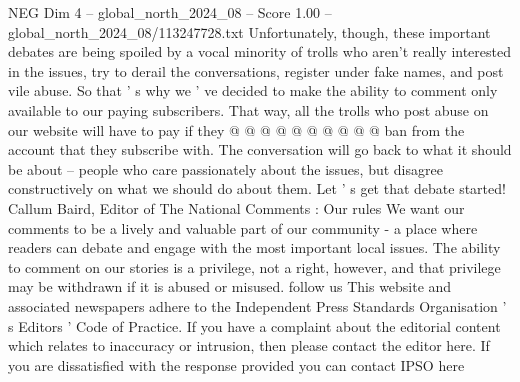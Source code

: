 \begin{textsample}{NEG Dim 4 – global\_north\_2024\_08 – Score 1.00 – global\_north\_2024\_08/113247728.txt}
Unfortunately, though, these important debates are being spoiled by a vocal minority of trolls who aren't really interested in the issues, try to derail the conversations, register under fake names, and post vile abuse.
So that ' s why we ' ve decided to make the ability to comment only available to our paying subscribers.
That way, all the trolls who post abuse on our website will have to pay if they @ @ @ @ @ @ @ @ @ @ ban from the account that they subscribe with.
The conversation will go back to what it should be about -- people who care passionately about the issues, but disagree constructively on what we should do about them.
Let ' s get that debate started!
Callum Baird, Editor of The National Comments : Our rules We want our comments to be a lively and valuable part of our community - a place where readers can debate and engage with the most important local issues.
The ability to comment on our stories is a privilege, not a right, however, and that privilege may be withdrawn if it is abused or misused. follow us This website and associated newspapers adhere to the Independent Press Standards Organisation ' s Editors ' Code of Practice.
If you have a complaint about the editorial content which relates to inaccuracy or intrusion, then please contact the editor here.
If you are dissatisfied with the response provided you can contact IPSO here

\end{textsample}
